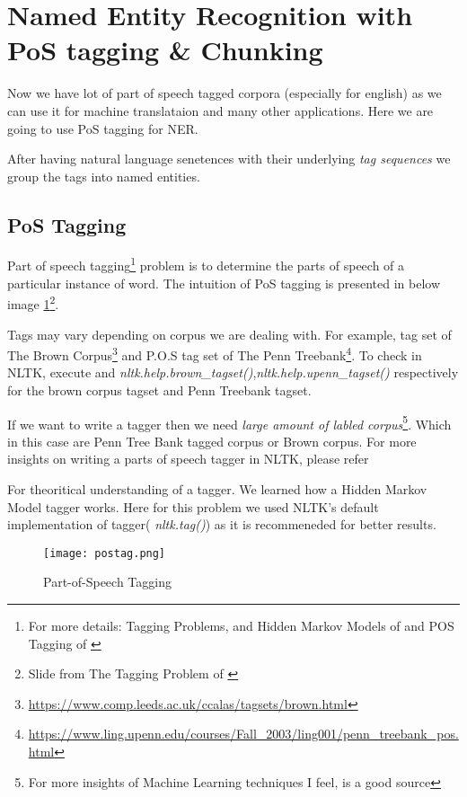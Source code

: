 \documentclass[12pt]{report}
\begin{document}
\pagebreak
\section{Named Entity Recognition with PoS tagging \& Chunking}
\par Now we have lot of part of speech tagged corpora (especially for english) as we can
 use it for machine translataion and many other applications. Here we are going to use 
 PoS tagging for NER. \par After having natural language senetences with their underlying \textit{
 tag sequences} we group the tags into named entities.

\subsection{PoS Tagging}
\par Part of speech tagging\footnote{For more details: Tagging Problems, and Hidden Markov Models of \cite{mc} and POS Tagging of \cite{SNLP}} problem is to determine the parts of speech of a particular
instance of word. The intuition of PoS tagging is presented in below image \ref{pos}\footnote{Slide from
 The Tagging Problem of \cite{mc}}.
\par Tags may vary depending on corpus we are dealing with. For example, tag set of The Brown Corpus\footnote{\url{https://www.comp.leeds.ac.uk/ccalas/tagsets/brown.html}} and P.O.S tag set of The Penn Treebank\footnote{\url{https://www.ling.upenn.edu/courses/Fall_2003/ling001/penn_treebank_pos.html}}.
To check in NLTK, execute and \textit{nltk.help.brown\_tagset()},\textit{nltk.help.upenn\_tagset()} respectively for the brown corpus tagset and Penn Treebank tagset.
\par If we want to write a tagger then we need \textit{large amount of labled corpus}\footnote{For more insights of 
Machine Learning techniques I feel, \cite{Videos} is a good source}. Which in this case
 are Penn Tree Bank tagged corpus or Brown corpus.
For more insights on writing a parts of speech tagger in NLTK, please refer\cite{tag}
\par For theoritical understanding of a tagger. We learned how a Hidden Markov Model tagger\cite{hmm}
 works. Here for this problem we used NLTK's default implementation of tagger(\textit{
 nltk.tag()}) as it is recommeneded for better results.

\begin{figure}[htp]
\centering
\texttt{[image: postag.png]}
\caption{Part-of-Speech Tagging}
\label{pos}
\end{figure}
\end{document}

